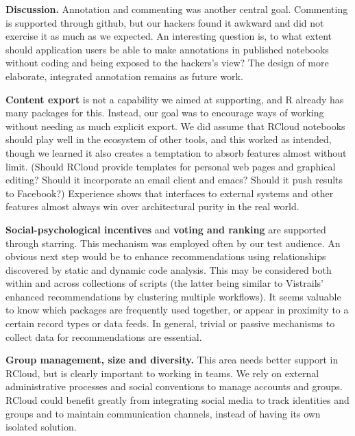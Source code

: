 {\bf Discussion.} Annotation and commenting was another central goal.
Commenting is supported through github, but our hackers found it
awkward and did not exercise it as much as we expected.
An interesting question is, to what extent should application users
be able to make annotations in published notebooks without coding
and being exposed to the hackers's view? The design of
more elaborate, integrated annotation remains as future work.

{\bf Content export} is not a capability we aimed at supporting,
and R already has many packages for this. Instead, our goal was to
encourage ways of working without needing as much explicit export.
We did assume that RCloud notebooks should play well in the ecosystem
of other tools, and this worked as intended, though we learned it also
creates a temptation to absorb features almost without limit. (Should
RCloud provide templates for personal web pages and graphical
editing? Should it incorporate an email client and emacs?
Should it push results to Facebook?) Experience shows that interfaces
to external systems and other features almost always win over architectural
purity in the real world. 

{\bf Social-psychological incentives} and {\bf voting and ranking} are supported
through starring. This mechanism was employed often by our test
audience.  An obvious next step would be to enhance recommendations using
relationships discovered by static and dynamic code analysis. This may be
considered both within and across collections of scripts (the latter being
similar to Vistrails' enhanced recommendations by clustering multiple
workflows).  It seems valuable to know which packages are frequently used
together, or appear in proximity to a certain record types or data feeds.  In
general, trivial or passive mechanisms to collect data for recommendations are
essential.

{\bf Group management, size and diversity.} This area needs better
support in RCloud, but is clearly important to working in teams.
We rely on external administrative processes and social conventions
to manage accounts and groups. RCloud could benefit greatly from
integrating social media to track identities and groups and to maintain
communication channels, instead of having its own isolated solution.

